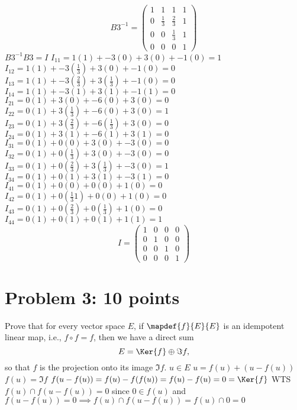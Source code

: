 \documentclass[12pt]{article}
\begin{document}
\[
B3^{-1} = 
\begin{pmatrix}
1 & 1  & 1 & 1 \\
0 &  \frac{1}{3}  & \frac{2}{3} & 1 \\
0 &  0  & \frac{1}{3}  & 1 \\
0 &  0  & 0  & 1
\end{pmatrix} 
\]
$B3^{-1}B3=I$
\newline $I_{11}=1(1)+-3(0)+3(0)+-1(0)=1$
\newline $I_{12}=1(1)+-3(\frac{1}{3})+3(0)+-1(0)=0$
\newline $I_{13}=1(1)+-3(\frac{2}{3})+3(\frac{1}{3})+-1(0)=0$
\newline $I_{14}=1(1)+-3(1)+3(1)+-1(1)=0$
\newline $I_{21}=0(1)+3(0)+-6(0)+3(0)=0$
\newline $I_{22}=0(1)+3(\frac{1}{3})+-6(0)+3(0)=1$
\newline $I_{23}=0(1)+3(\frac{2}{3})+-6(\frac{1}{3})+3(0)=0$
\newline $I_{24}=0(1)+3(1)+-6(1)+3(1)=0$
\newline $I_{31}=0(1)+0(0)+3(0)+-3(0)=0$
\newline $I_{32}=0(1)+0(\frac{1}{3})+3(0)+-3(0)=0$
\newline $I_{33}=0(1)+0(\frac{2}{3})+3(\frac{1}{3})+-3(0)=1$
\newline $I_{34}=0(1)+0(1)+3(1)+-3(1)=0$
\newline $I_{41}=0(1)+0(0)+0(0)+1(0)=0$
\newline $I_{42}=0(1)+0(\frac{1}{3}1)+0(0)+1(0)=0$
\newline $I_{43}=0(1)+0(\frac{2}{3})+0(\frac{1}{3})+1(0)=0$
\newline $I_{44}=0(1)+0(1)+0(1)+1(1)=1$
\[
I = 
\begin{pmatrix}
1 & 0 & 0 & 0\\
0 & 1 & 0 & 0 \\
0 & 0 & 1 & 0 \\
0 & 0 & 0 & 1
\end{pmatrix}
\]

\section*{Problem 3: 10 points}
\label{prob-5.2}
Prove that 
for every vector space $E$, if $\mapdef{f}{E}{E}$ is an idempotent
linear map, i.e., $f\circ f = f$, then we have a direct sum
\[
E = \Ker{f} \oplus \Im{f},
\]
so that $f$ is the projection onto its image $\Im{f}$.
\newline $u \in E$
\newline $u=f(u) + (u - f(u))$
\newline $f(u)= \Im {f}$
\newline $f(u-f(u))=f(u)-f(f(u))=f(u)-f(u)=0=\Ker{f}$
\newline WTS $f(u) \cap f(u-f(u))=0$
\newline since $0 \in f(u)$ and $f(u-f(u))=0 \implies f(u) \cap f(u-f(u))=f(u) \cap 0=0$
\end{document}
